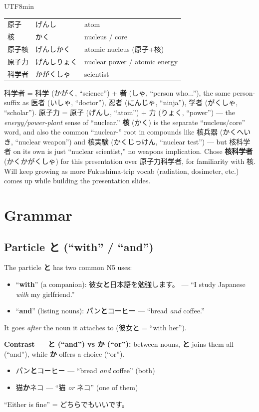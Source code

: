 \documentclass[11pt]{article}
\begin{document}
\begin{CJK}{UTF8}{min}
\begin{center}
\begin{tabular}{@{}lll@{}}
原子     & げんし         & atom \\
核       & かく           & nucleus / core \\
原子核   & げんしかく     & atomic nucleus (原子+核) \\
原子力   & げんしりょく   & nuclear power / atomic energy \\
科学者   & かがくしゃ     & scientist \\
\bottomrule
\end{tabular}
\end{center}
科学者 = 科学 (かがく, ``science'') + \textbf{者} (しゃ, ``person who...''), the
same person-suffix as 医者 (いしゃ, ``doctor''), 忍者 (にんじゃ, ``ninja''), 学者
(がくしゃ, ``scholar''). 原子力 = 原子 (げんし, ``atom'') + 力 (りょく, ``power'')
--- the \emph{energy/power-plant} sense of ``nuclear.'' \textbf{核} (かく) is
the separate ``nucleus/core'' word, and also the common ``nuclear-'' root in
compounds like 核兵器 (かくへいき, ``nuclear weapon'') and 核実験 (かくじっけん,
``nuclear test'') --- but 核科学者 on its own is just ``nuclear scientist,''
no weapons implication. Chose \textbf{核科学者} (かくかがくしゃ) for this
presentation over 原子力科学者, for familiarity with 核. Will keep growing as
more Fukushima-trip vocab (radiation, dosimeter, etc.) comes up while
building the presentation slides.

\section{Grammar}

\subsection{Particle \texorpdfstring{と}{to} (``with'' / ``and'')}
The particle \textbf{と} has two common N5 uses:
\begin{itemize}
  \item ``\textbf{with}'' (a companion): 彼女\textbf{と}日本語を勉強します。 ---
        ``I study Japanese \emph{with} my girlfriend.''
  \item ``\textbf{and}'' (listing nouns): パン\textbf{と}コーヒー --- ``bread
        \emph{and} coffee.''
\end{itemize}
It goes \emph{after} the noun it attaches to (彼女と = ``with her'').

\textbf{Contrast --- と (``and'') vs か (``or''):} between nouns, \textbf{と}
joins them all (``and''), while \textbf{か} offers a choice (``or'').
\begin{itemize}
  \item パン\textbf{と}コーヒー --- ``bread \emph{and} coffee'' (both)
  \item 猫\textbf{か}ネコ --- ``猫 \emph{or} ネコ'' (one of them)
\end{itemize}
``Either is fine'' = どちらでもいいです。


\end{CJK}
\end{document}
